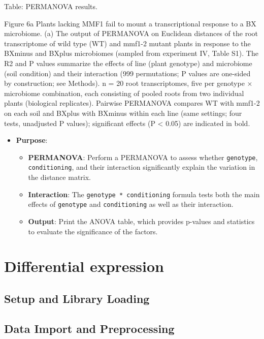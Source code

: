\documentclass[
  11pt,
]{article}
\providecommand{\tightlist}{%
  \setlength{\itemsep}{0pt}\setlength{\parskip}{0pt}}\usepackage{longtable,booktabs,array}
\begin{document}
Table: PERMANOVA results.

Figure 6a \textbar{} Plants lacking MMF1 fail to mount a transcriptional
response to a BX microbiome. (a) The output of PERMANOVA on Euclidean
distances of the root transcriptome of wild type (WT) and mmf1-2 mutant
plants in response to the BXminus and BXplus microbiomes (sampled from
experiment IV, Table S1). The R2 and P values summarize the effects of
line (plant genotype) and microbiome (soil condition) and their
interaction (999 permutations; P values are one-sided by construction;
see Methods). n = 20 root transcriptomes, five per genotype × microbiome
combination, each consisting of pooled roots from two individual plants
(biological replicates). Pairwise PERMANOVA compares WT with mmf1-2 on
each soil and BXplus with BXminus within each line (same settings; four
tests, unadjusted P values); significant effects (P \textless{} 0.05)
are indicated in bold.

\begin{itemize}
\tightlist
\item
  \textbf{Purpose}:

  \begin{itemize}
  \tightlist
  \item
    \textbf{PERMANOVA}: Perform a PERMANOVA to assess whether
    \texttt{genotype}, \texttt{conditioning}, and their interaction
    significantly explain the variation in the distance matrix.
  \item
    \textbf{Interaction}: The \texttt{genotype\ *\ conditioning} formula
    tests both the main effects of \texttt{genotype} and
    \texttt{conditioning} as well as their interaction.
  \item
    \textbf{Output}: Print the ANOVA table, which provides p-values and
    statistics to evaluate the significance of the factors.
  \end{itemize}
\end{itemize}

\section{Differential expression}\label{differential-expression}

\subsection{Setup and Library Loading}\label{setup-and-library-loading}

\subsection{Data Import and
Preprocessing}\label{data-import-and-preprocessing}
\end{document}
